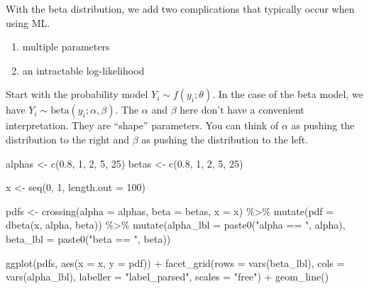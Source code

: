 \documentclass[
]{book}
\newenvironment{Shaded}{\begin{snugshade}}{\end{snugshade}}
\newcommand{\AttributeTok}[1]{\textcolor[rgb]{0.77,0.63,0.00}{#1}}
\newcommand{\DecValTok}[1]{\textcolor[rgb]{0.00,0.00,0.81}{#1}}
\newcommand{\FloatTok}[1]{\textcolor[rgb]{0.00,0.00,0.81}{#1}}
\newcommand{\FunctionTok}[1]{\textcolor[rgb]{0.00,0.00,0.00}{#1}}
\newcommand{\NormalTok}[1]{#1}
\newcommand{\OtherTok}[1]{\textcolor[rgb]{0.56,0.35,0.01}{#1}}
\newcommand{\SpecialCharTok}[1]{\textcolor[rgb]{0.00,0.00,0.00}{#1}}
\newcommand{\StringTok}[1]{\textcolor[rgb]{0.31,0.60,0.02}{#1}}
\providecommand{\tightlist}{%
  \setlength{\itemsep}{0pt}\setlength{\parskip}{0pt}}
\begin{document}
With the beta distribution, we add two complications that typically
occur when using ML.

\begin{enumerate}
\def\labelenumi{\arabic{enumi}.}
\tightlist
\item
  multiple parameters
\item
  an intractable log-likelihood
\end{enumerate}

Start with the probability model \(Y_i \sim f(y_i; \theta)\). In the
case of the beta model, we have
\(Y_i \sim \text{beta}(y_i; \alpha, \beta)\). The \(\alpha\) and
\(\beta\) here don't have a convenient interpretation. They are
``shape'' parameters. You can think of \(\alpha\) as pushing the
distribution to the right and \(\beta\) as pushing the distribution to
the left.

\begin{Shaded}
\begin{Highlighting}[]
\NormalTok{alphas }\OtherTok{\textless{}{-}} \FunctionTok{c}\NormalTok{(}\FloatTok{0.8}\NormalTok{, }\DecValTok{1}\NormalTok{, }\DecValTok{2}\NormalTok{, }\DecValTok{5}\NormalTok{, }\DecValTok{25}\NormalTok{)}
\NormalTok{betas }\OtherTok{\textless{}{-}} \FunctionTok{c}\NormalTok{(}\FloatTok{0.8}\NormalTok{, }\DecValTok{1}\NormalTok{, }\DecValTok{2}\NormalTok{, }\DecValTok{5}\NormalTok{, }\DecValTok{25}\NormalTok{)}

\NormalTok{x }\OtherTok{\textless{}{-}} \FunctionTok{seq}\NormalTok{(}\DecValTok{0}\NormalTok{, }\DecValTok{1}\NormalTok{, }\AttributeTok{length.out =} \DecValTok{100}\NormalTok{)}

\NormalTok{pdfs }\OtherTok{\textless{}{-}} \FunctionTok{crossing}\NormalTok{(}\AttributeTok{alpha =}\NormalTok{ alphas, }
                 \AttributeTok{beta =}\NormalTok{ betas, }
                 \AttributeTok{x =}\NormalTok{ x) }\SpecialCharTok{\%\textgreater{}\%}
  \FunctionTok{mutate}\NormalTok{(}\AttributeTok{pdf =} \FunctionTok{dbeta}\NormalTok{(x, alpha, beta)) }\SpecialCharTok{\%\textgreater{}\%}
  \FunctionTok{mutate}\NormalTok{(}\AttributeTok{alpha\_lbl =} \FunctionTok{paste0}\NormalTok{(}\StringTok{"alpha == "}\NormalTok{, alpha),}
         \AttributeTok{beta\_lbl =} \FunctionTok{paste0}\NormalTok{(}\StringTok{"beta == "}\NormalTok{, beta)) }

\FunctionTok{ggplot}\NormalTok{(pdfs, }\FunctionTok{aes}\NormalTok{(}\AttributeTok{x =}\NormalTok{ x, }\AttributeTok{y =}\NormalTok{ pdf)) }\SpecialCharTok{+} 
  \FunctionTok{facet\_grid}\NormalTok{(}\AttributeTok{rows =} \FunctionTok{vars}\NormalTok{(beta\_lbl), }\AttributeTok{cols =} \FunctionTok{vars}\NormalTok{(alpha\_lbl), }
             \AttributeTok{labeller =} \StringTok{"label\_parsed"}\NormalTok{, }\AttributeTok{scales =} \StringTok{"free"}\NormalTok{) }\SpecialCharTok{+} 
  \FunctionTok{geom\_line}\NormalTok{()}
\end{Highlighting}
\end{Shaded}
\end{document}
